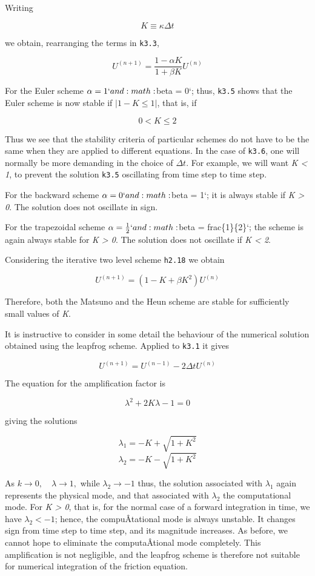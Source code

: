 Writing

{\[K \equiv \kappa \Delta t\]}

we obtain, rearranging the terms in \texttt{k3.3},

{\[U^{\left( n + 1 \right)} = \frac{1 - \alpha K}{1 + \beta K}U^{\left( n \right)}\]}

For the Euler scheme \(\alpha = 1`and :math:\)beta = 0`; thus,
\texttt{k3.5} shows that the Euler scheme is now stable if
\(\left| 1 - K \leq 1 \right|\), that is, if

{\[0 < K \leq 2\]}

Thus we see that the stability criteria of particular schemes do not
have to be the same when they are applied to different equations. In the
case of \texttt{k3.6}, one will normally be more demanding in the choice
of \(\Delta t\). For example, we will want \emph{K \textless{} 1}, to
prevent the solution \texttt{k3.5} oscillating from time step to time
step.

For the backward scheme \(\alpha = 0`and :math:\)beta = 1`; it is always
stable if \emph{K \textgreater{} 0}. The solution does not oscillate in
sign.

For the trapezoidal scheme \(\alpha = \frac{1}{2}`and
:math:\)beta = frac\{1\}\{2\}`; the scheme is again always stable for
\emph{K \textgreater{} 0}. The solution does not oscillate if \emph{K
\textless{} 2}.

Considering the iterative two level scheme \texttt{h2.18} we obtain

{\[U^{\left( n + 1 \right)} = \left( 1 - K + \beta K^{2} \right)U^{\left( n \right)}\]}

Therefore, both the Matsuno and the Heun scheme are stable for
sufficiently small values of \emph{K}.

It is instructive to consider in some detail the behaviour of the
numerical solution obtained using the leapfrog scheme. Applied to
\texttt{k3.1} it gives

{\[U^{\left( n + 1 \right)} = U^{\left( n - 1 \right)} - 2\Delta t U^{\left( n \right)}\]}

The equation for the amplification factor is

\[\lambda^{2} + 2K\lambda - 1 = 0\]

giving the solutions

{\[\lambda_{1} = - K + \sqrt{1 + K^{2}}\]\[\lambda_{2} = - K - \sqrt{1 + K^{2}}\]}

As \(k \rightarrow 0, \quad \lambda \rightarrow 1,\) while
\(\lambda_{2} \rightarrow - 1\) thus, the solution associated with
\(\lambda_{1}\) again represents the physical mode, and that associated
with \(\lambda_{2}\) the computational mode. For \emph{K \textgreater{}
0}, that is, for the normal case of a forward integration in time, we
have \(\lambda_{2} < - 1\); hence, the compuÂ­tational mode is always
unstable. It changes sign from time step to time step, and its magnitude
increases. As before, we cannot hope to eliminate the computaÂ­tional
mode completely. This amplification is not negligible, and the leapfrog
scheme is therefore not suitable for numerical integration of the
friction equation.

